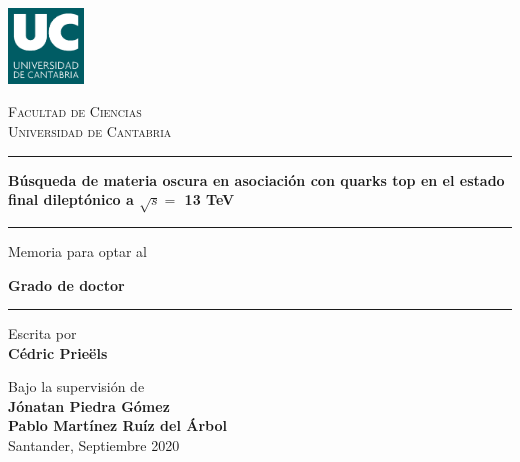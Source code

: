\documentclass[a4paper, 10pt, openright]{report}
\begin{document}

\thispagestyle{empty}
\phantom{a}
\vfill
\newpage

\begin{titlepage}

	\centering
	\includegraphics[width=0.15\textwidth]{figs/image_UC.png}\par
	{\scshape\LARGE Facultad de Ciencias \\ \vspace{-15pt} Universidad de Cantabria \par}
	
	\vspace{0.8cm}
	
	\noindent\rule{15cm}{0.4pt}\par 
	{\huge\bfseries B\'{u}squeda de materia oscura en asociaci\'{o}n con quarks top en el estado final dilept\'{o}nico a $\sqrt{s} = $ 13 TeV\par \vspace{10pt}}
	\noindent\rule{15cm}{0.4pt}\par 
	
	{\vspace{20pt} \Large Memoria para optar al \par \LARGE \textbf{Grado de doctor} \vspace{20pt} \par \noindent\rule{15cm}{0.4pt}}
	
	\vspace{0.8cm}
	{\Large Escrita por \\ \textbf{C\'{e}dric Prie\"{e}ls}\par}
	\vspace{0.5cm}
	{\Large Bajo la supervisi\'{o}n de \\ \textbf{J\'{o}natan Piedra G\'{o}mez} \\
	\vspace{-10pt}
	\textbf{Pablo Mart\'{i}nez Ru\'{i}z del \'{A}rbol}\\}
	\vspace{2.6cm}
	{\Large Santander, Septiembre 2020}
	\vfill

\end{titlepage}

\end{document}
